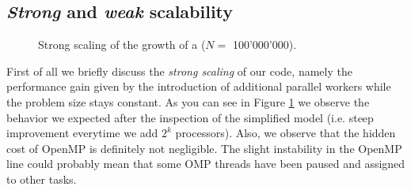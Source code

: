 \documentclass{article}
\begin{document}
\subsection{\emph{Strong} and \emph{weak} scalability}
\begin{figure}[t!]
    \centering
    \begin{subfigure}[b]{0.4\textwidth}
        \centering
    \end{subfigure}
    \hspace{1cm}
    \begin{subfigure}[b]{0.4\textwidth}
        \centering
    \end{subfigure}
\caption{Strong scaling of the growth of a \kdtree{} ($N = $ 100'000'000).}
\label{fig:strong_scaling}
\end{figure}
First of all we briefly discuss the \emph{strong scaling} of our code, namely
the performance gain given by the introduction of additional parallel workers
while the problem size stays constant. As you can see in Figure
\ref{fig:strong_scaling} we observe the behavior we expected after the
inspection of the simplified model (i.e. steep improvement everytime we add
$2^k$ processors). Also, we observe that the hidden cost of OpenMP is definitely
not negligible. The slight instability in the OpenMP line could probably mean
that some OMP threads have been paused and assigned to other tasks.
\end{document}
